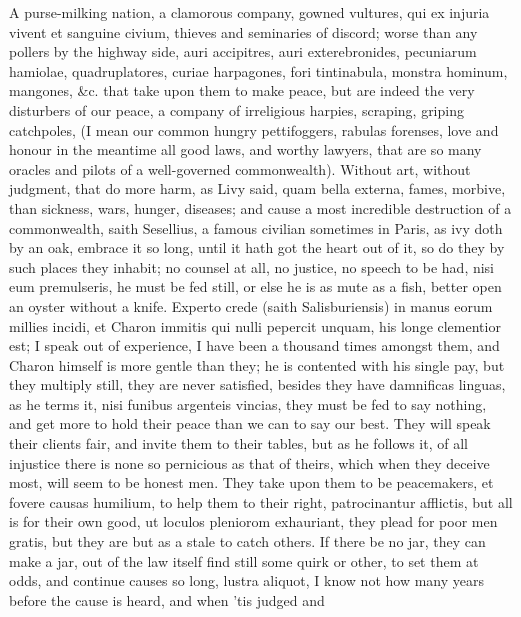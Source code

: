 {A purse-milking nation, a clamorous company, gowned vultures, qui
ex injuria vivent et sanguine civium, thieves and seminaries of
discord; worse than any pollers by the highway side, auri accipitres,
auri exterebronides, pecuniarum hamiolae, quadruplatores, curiae
harpagones, fori tintinabula, monstra hominum, mangones, \&c. that take
upon them to make peace, but are indeed the very disturbers of our
peace, a company of irreligious harpies, scraping, griping catchpoles,
(I mean our common hungry pettifoggers, rabulas forenses, love and
honour in the meantime all good laws, and worthy lawyers, that are so
many oracles and pilots of a well-governed commonwealth). Without
art, without judgment, that do more harm, as Livy said, quam bella
externa, fames, morbive, than sickness, wars, hunger, diseases; and
cause a most incredible destruction of a commonwealth, saith
Sesellius, a famous civilian sometimes in Paris, as ivy doth by an
oak, embrace it so long, until it hath got the heart out of it, so do
they by such places they inhabit; no counsel at all, no justice, no
speech to be had, nisi eum premulseris, he must be fed still, or else
he is as mute as a fish, better open an oyster without a knife. Experto
crede (saith  Salisburiensis) in manus eorum millies incidi, et
Charon immitis qui nulli pepercit unquam, his longe clementior est; I
speak out of experience, I have been a thousand times amongst them, and
Charon himself is more gentle than they; he is contented with his
single pay, but they multiply still, they are never satisfied, besides
they have damnificas linguas, as he terms it, nisi funibus argenteis
vincias, they must be fed to say nothing, and get more to hold
their peace than we can to say our best. They will speak their clients
fair, and invite them to their tables, but as he follows it, of
all injustice there is none so pernicious as that of theirs, which when
they deceive most, will seem to be honest men. They take upon them to
be peacemakers, et fovere causas humilium, to help them to their right,
patrocinantur afflictis, but all is for their own good, ut loculos
pleniorom exhauriant, they plead for poor men gratis, but they are but
as a stale to catch others. If there be no jar, they can make a
jar, out of the law itself find still some quirk or other, to set them
at odds, and continue causes so long, lustra aliquot, I know not how
many years before the cause is heard, and when 'tis judged and
}
